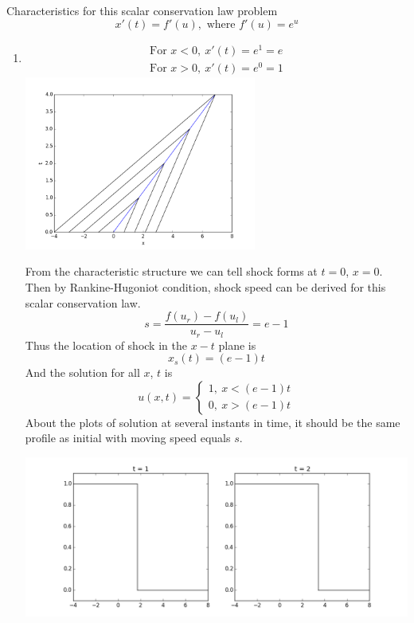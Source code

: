 \documentclass[11pt]{article}
\begin{document}
\begin{enumerate}
		\vskip 5pt
        \vskip 5pt
			
			Characteristics for this scalar conservation law problem
			\[
			x'(t)=f'(u), \text{ where } f'(u)=e^u
			\]
			\begin{enumerate}
			
			\item
				\begin{align*}
				\text{For } x<0,\ x'(t)=e^1=e\\
				\text{For } x>0,\ x'(t)=e^0=1
				\end{align*}	
				\hfil\includegraphics[width=3.0in]{problem_11_8a_char.png}\hfil
				
				From the characteristic structure we can tell shock forms at $t=0$, $x=0$. Then by Rankine-Hugoniot condition, shock speed can be derived for this scalar conservation law.
				\[
				s = \frac{f(u_r)-f(u_l)}{u_r-u_l}=e-1
				\]
				Thus the location of shock in the $x-t$ plane is
				\[
				x_s(t)=(e-1)t
				\]			
				And the solution for all $x$, $t$ is 
				\[
				u(x,t)=\begin{cases}1, \ x<(e-1)t \\ 0, \ x>(e-1)t \end{cases}
				\]
				About the plots of solution at several instants in time, it should be the same profile as initial with moving speed equals $s$. 
				
				\hfil\includegraphics[width=6.0in]{problem_11_8a.png}\hfil
				

\end{enumerate}
\end{enumerate}
\end{document}
